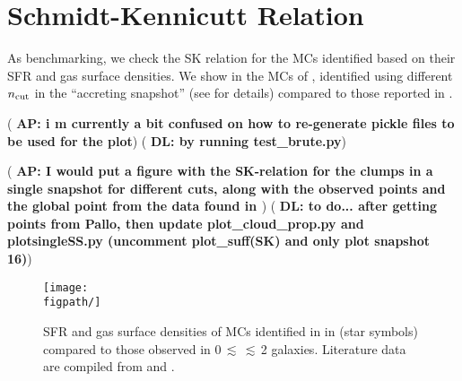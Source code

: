 \documentclass[iop]{emulateapj} %
\newcommand{\AP}[1]{({\bf \color{apcolor} AP: #1})}
\newcommand{\DL}[1]{({\bf \color{dlcolor} DL: #1})}
\begin{document}





\appendix
\section{Schmidt-Kennicutt Relation}
As benchmarking, we check the SK relation for the MCs identified based on their SFR and gas surface densities.
We show in  the MCs of \flower, identified using different $n_{\rm cut}$ in the ``accreting snapshot'' 
(see  for details) compared to those reported in \obs. 

\AP{i m currently a bit confused on how to re-generate pickle files to be used for the plot}
\DL{by running test\_brute.py}

\AP{I would put a figure with the SK-relation for the clumps in a single snapshot for different cuts, along with the observed points and the global \flower point from the data found in \citet{Pallottini17a}}
\DL{to do... after getting points from Pallo, then update plot\_cloud\_prop.py and plotsingleSS.py (uncomment plot\_suff(SK) and only plot snapshot 16)}


\begin{figure*}[htbp]
\centering
\texttt{[image: \\figpath/]}
\caption{
SFR and gas surface densities of MCs identified in \flower in  (star symbols) compared to those 
observed in 0\,$\lesssim$\,\z$\lesssim$\,2 galaxies.
Literature data are compiled from \citealt{Kennicutt98a, Bouche07a, Daddi10a, Daddi10b, Genzel10a, Tacconi10a} and 
\citealt{Pallottini17b}.
\label{fig:sk}}
\end{figure*}




%

%
\end{document}
